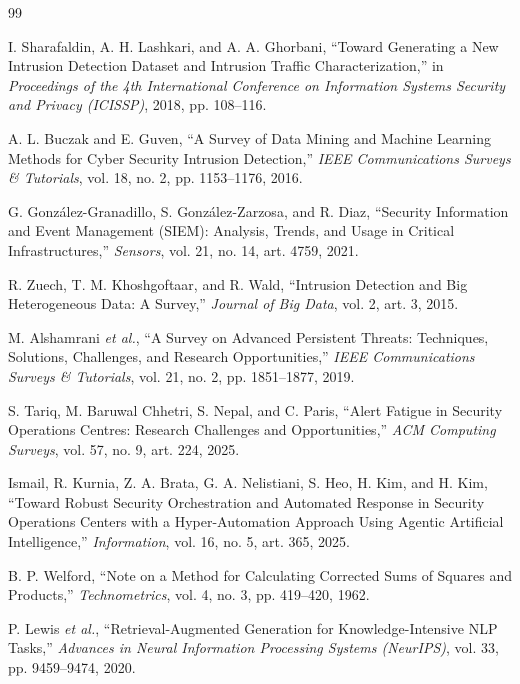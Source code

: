 \documentclass[12pt,a4paper]{report}
\begin{document}
\begin{thebibliography}{99}

I. Sharafaldin, A. H. Lashkari, and A. A. Ghorbani, ``Toward Generating a New Intrusion Detection Dataset and Intrusion Traffic Characterization,'' in \textit{Proceedings of the 4th International Conference on Information Systems Security and Privacy (ICISSP)}, 2018, pp. 108--116.

A. L. Buczak and E. Guven, ``A Survey of Data Mining and Machine Learning Methods for Cyber Security Intrusion Detection,'' \textit{IEEE Communications Surveys \& Tutorials}, vol. 18, no. 2, pp. 1153--1176, 2016.

G. González-Granadillo, S. González-Zarzosa, and R. Diaz, ``Security Information and Event Management (SIEM): Analysis, Trends, and Usage in Critical Infrastructures,'' \textit{Sensors}, vol. 21, no. 14, art. 4759, 2021.

R. Zuech, T. M. Khoshgoftaar, and R. Wald, ``Intrusion Detection and Big Heterogeneous Data: A Survey,'' \textit{Journal of Big Data}, vol. 2, art. 3, 2015.

M. Alshamrani \textit{et al.}, ``A Survey on Advanced Persistent Threats: Techniques, Solutions, Challenges, and Research Opportunities,'' \textit{IEEE Communications Surveys \& Tutorials}, vol. 21, no. 2, pp. 1851--1877, 2019.

S. Tariq, M. Baruwal Chhetri, S. Nepal, and C. Paris, ``Alert Fatigue in Security Operations Centres: Research Challenges and Opportunities,'' \textit{ACM Computing Surveys}, vol. 57, no. 9, art. 224, 2025.

Ismail, R. Kurnia, Z. A. Brata, G. A. Nelistiani, S. Heo, H. Kim, and H. Kim, ``Toward Robust Security Orchestration and Automated Response in Security Operations Centers with a Hyper-Automation Approach Using Agentic Artificial Intelligence,'' \textit{Information}, vol. 16, no. 5, art. 365, 2025.

B. P. Welford, ``Note on a Method for Calculating Corrected Sums of Squares and Products,'' \textit{Technometrics}, vol. 4, no. 3, pp. 419--420, 1962.

P. Lewis \textit{et al.}, ``Retrieval-Augmented Generation for Knowledge-Intensive NLP Tasks,'' \textit{Advances in Neural Information Processing Systems (NeurIPS)}, vol. 33, pp. 9459--9474, 2020.


\end{thebibliography}
\end{document}
